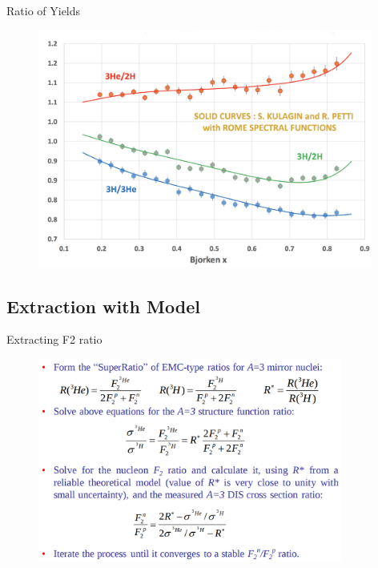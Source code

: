 \documentclass[12pt]{beamer}
\begin{document}
\begin{frame}{Ratio of Yields}
\vspace{-20pt}
\begin{figure}
	\includegraphics[width=11cm]{../images/MARA_rations.pdf}
\end{figure}
\end{frame}



\subsection[Extraction with Model]{Extraction with Model}
\begin{frame}{Extracting F2 ratio}

\begin{figure}
	\includegraphics[width=10cm]{../images/f2ext.png}
\end{figure}
\end{frame}
\end{document}
